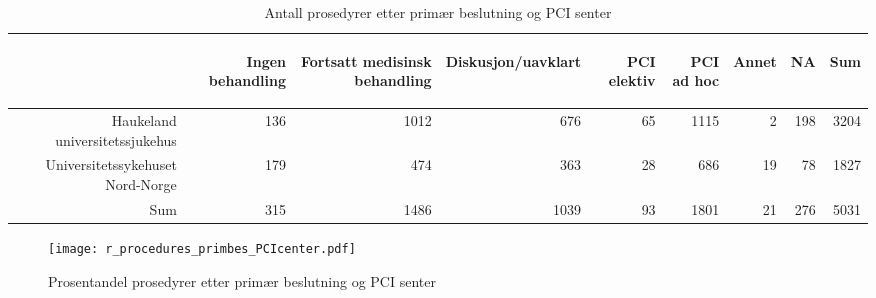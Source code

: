 \documentclass[norsk, a4paper]{report}
\begin{document}
\begin{tiny}
\begin{table}[ht]
\centering
\begin{tabular}{rrrrrrrrr}
  \toprule
 & \begin{sideways} Ingen behandling \end{sideways} & \begin{sideways} Fortsatt medisinsk behandling \end{sideways} & \begin{sideways} Diskusjon/uavklart \end{sideways} & \begin{sideways} PCI elektiv \end{sideways} & \begin{sideways} PCI ad hoc \end{sideways} & \begin{sideways} Annet \end{sideways} & \begin{sideways} NA \end{sideways} & \begin{sideways} Sum \end{sideways} \\ 
  \midrule
Haukeland universitetssjukehus & 136 & 1012 & 676 & 65 & 1115 & 2 & 198 & 3204 \\ 
  Universitetssykehuset Nord-Norge & 179 & 474 & 363 & 28 & 686 & 19 & 78 & 1827 \\ 
  Sum & 315 & 1486 & 1039 & 93 & 1801 & 21 & 276 & 5031 \\ 
   \bottomrule
\end{tabular}
\caption{Antall prosedyrer etter primær beslutning og PCI senter} 
\end{table}\end{tiny}

\clearpage


\begin{figure}[ht]
  \centering
\texttt{[image: r\_procedures\_primbes\_PCIcenter.pdf]}  \caption{Prosentandel prosedyrer etter primær beslutning og PCI senter}
\end{figure}
\end{document}
